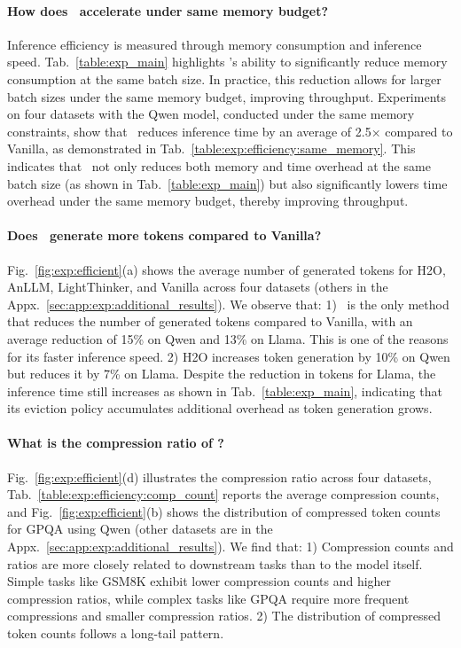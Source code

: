 \paragraph{How does \ours~accelerate under same memory budget?}
Inference efficiency is measured through memory consumption and inference speed.
Tab.~\ref{table:exp_main} highlights \ours’s ability to significantly reduce memory consumption at the same batch size. 
In practice, this reduction allows for larger batch sizes under the same memory budget, improving throughput. 
Experiments on four datasets with the Qwen model, conducted under the same memory constraints, show that \ours~reduces inference time by an average of 2.5× compared to Vanilla, as demonstrated in Tab.~\ref{table:exp:efficiency:same_memory}.
This indicates that \ours~not only reduces both memory and time overhead at the same batch size (as shown in Tab.~\ref{table:exp_main}) but also significantly lowers time overhead under the same memory budget, thereby improving throughput.


\paragraph{Does \ours~generate more tokens compared to Vanilla?}
Fig.~\ref{fig:exp:efficient}(a) shows the average number of generated tokens for H2O, AnLLM, LightThinker, and Vanilla across four datasets (others in the Appx.~\ref{sec:app:exp:additional_results}). 
We observe that:
1) \ours~is the only method that reduces the number of generated tokens compared to Vanilla, with an average reduction of 15\% on Qwen and 13\% on Llama. 
This is one of the reasons for its faster inference speed.
2) H2O increases token generation by 10\% on Qwen but reduces it by 7\% on Llama. 
Despite the reduction in tokens for Llama, the inference time still increases as shown in Tab.~\ref{table:exp_main}, indicating that its eviction policy accumulates additional overhead as token generation grows.

\paragraph{What is the compression ratio of \ours?}
Fig.~\ref{fig:exp:efficient}(d) illustrates the compression ratio across four datasets, 
Tab.~\ref{table:exp:efficiency:comp_count} reports the average compression counts, 
and Fig.~\ref{fig:exp:efficient}(b) shows the distribution of compressed token counts for GPQA using Qwen (other datasets are in the Appx.~\ref{sec:app:exp:additional_results}). 
We find that:
1) Compression counts and ratios are more closely related to downstream tasks than to the model itself. 
Simple tasks like GSM8K exhibit lower compression counts and higher compression ratios, while complex tasks like GPQA require more frequent compressions and smaller compression ratios. 
2) The distribution of compressed token counts follows a long-tail pattern. 

